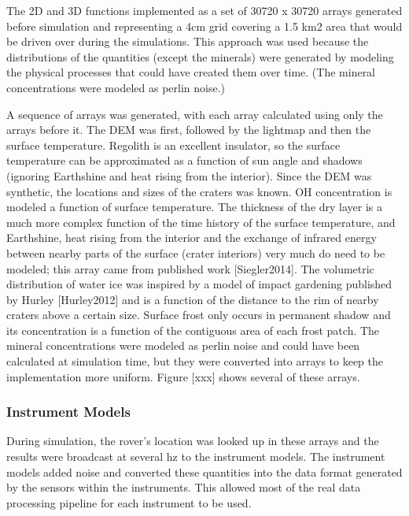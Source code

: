 \documentclass[twocolumn,letterpaper]{IEEEAerospaceCLS}  %
\begin{document}
The 2D and 3D functions implemented as a set of 30720 x 30720 arrays generated before simulation and representing a 4cm grid covering a 1.5 km2 area that would be driven over during the simulations.  This approach was used because the distributions of the quantities (except the minerals) were generated by modeling the physical processes that could have created them over time.  (The mineral concentrations were modeled as perlin noise.)

A sequence of arrays was generated, with each array calculated using only the arrays before it.  The DEM was first, followed by the lightmap and then the surface temperature.  Regolith is an excellent insulator, so the surface temperature can be approximated as a function of sun angle and shadows (ignoring Earthshine and heat rising from the interior).  Since the DEM was synthetic, the locations and sizes of the craters was known.  OH concentration is modeled a function of surface temperature.  The thickness of the dry layer is a much more complex function of the time history of the surface temperature, and Earthshine, heat rising from the interior and the exchange of infrared energy between nearby parts of the surface (crater interiors) very much do need to be modeled; this array came from published work [Siegler2014].  The volumetric distribution of water ice was inspired by a model of impact gardening published by Hurley [Hurley2012] and is a function of the distance to the rim of nearby craters above a certain size.  Surface frost only occurs in permanent shadow and its concentration is a function of the contiguous area of each frost patch.  The mineral concentrations were modeled as perlin noise and could have been calculated at simulation time, but they were converted into arrays to keep the implementation more uniform.  Figure [xxx] shows several of these arrays.

\subsubsection{Instrument Models}
During simulation, the rover's location was looked up in these arrays and the results were broadcast at several hz to the instrument models.  The instrument models added noise and converted these quantities into the data format generated by the sensors within the instruments.  This allowed most of the real data processing pipeline for each instrument to be used.
\end{document}
